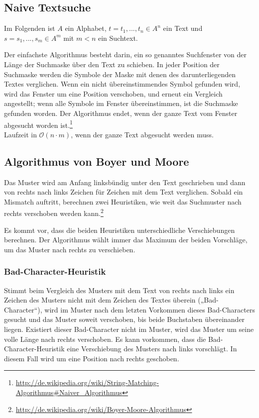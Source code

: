\subsection{Naive Textsuche}
Im Folgenden ist \(A\) ein Alphabet, \(t = t_1,...,t_n \in A^n\) ein Text und \(s = s_1,...,s_m \in A^m\) mit \(m<n\) ein Suchtext.

Der einfachste Algorithmus besteht darin, ein so genanntes Suchfenster von der Länge der Suchmaske über den Text zu schieben. In jeder Position der Suchmaske werden die Symbole der Maske mit denen des darunterliegenden Textes verglichen. Wenn ein nicht übereinstimmendes Symbol gefunden wird, wird das Fenster um eine Position verschoben, und erneut ein Vergleich angestellt; wenn alle Symbole im Fenster übereinstimmen, ist die Suchmaske gefunden worden. Der Algorithmus endet, wenn der ganze Text vom Fenster abgesucht worden ist.\footnote{\url{http://de.wikipedia.org/wiki/String-Matching-Algorithmus\#Naiver_Algorithmus}}
\text{}\\


Laufzeit in \(\mathcal{O}(n\cdot m)\), wenn der ganze Text abgesucht werden muss.

\subsection{Algorithmus von Boyer und Moore}
Das Muster wird am Anfang linksbündig unter den Text geschrieben und dann von rechts nach links Zeichen für Zeichen mit dem Text verglichen. Sobald ein Mismatch auftritt, berechnen zwei Heuristiken, wie weit das Suchmuster nach rechts verschoben werden kann.\footnote{\url{http://de.wikipedia.org/wiki/Boyer-Moore-Algorithmus}}

Es kommt vor, dass die beiden Heuristiken unterschiedliche Verschiebungen berechnen. Der Algorithmus wählt immer das Maximum der beiden Vorschläge, um das Muster nach rechts zu verschieben.

\subsubsection{Bad-Character-Heuristik}
Stimmt beim Vergleich des Musters mit dem Text von rechts nach links ein Zeichen des Musters nicht mit dem Zeichen des Textes überein („Bad-Character“), wird im Muster nach dem letzten Vorkommen dieses Bad-Characters gesucht und das Muster soweit verschoben, bis beide Buchstaben übereinander liegen. Existiert dieser Bad-Character nicht im Muster, wird das Muster um seine volle Länge nach rechts verschoben. Es kann vorkommen, dass die Bad-Character-Heuristik eine Verschiebung des Musters nach links vorschlägt. In diesem Fall wird um eine Position nach rechts geschoben.

